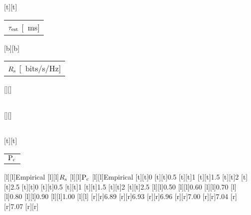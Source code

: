 %    
%
%
%
[t][t]{\fontsize{8}{12}\selectfont \color[rgb]{0,0,0}\setlength{\tabcolsep}{0pt}\begin{tabular}{c}$\tau_{\text{est}}$ [\SI{}{ms}]\end{tabular}}%
[b][b]{\fontsize{8}{12}\selectfont \color[rgb]{0,0,0}\setlength{\tabcolsep}{0pt}\begin{tabular}{c}$R_{\text{s}}$ [\SI{}{bits/s/Hz}]\end{tabular}}%
[][]{\fontsize{10}{15}\selectfont \color[rgb]{0,0,0}\setlength{\tabcolsep}{0pt}\begin{tabular}{c} \end{tabular}}%
[][]{\fontsize{10}{15}\selectfont \color[rgb]{0,0,0}\setlength{\tabcolsep}{0pt}\begin{tabular}{c} \end{tabular}}%
[t][t]{\fontsize{8}{12}\selectfont \color[rgb]{0,0,0}\setlength{\tabcolsep}{0pt}\begin{tabular}{c}$\text{P}_{\text{c}}$\end{tabular}}%
[l][l]{\fontsize{8}{12}\selectfont \color[rgb]{0,0,0}Empirical}%
[l][l]{\fontsize{8}{12}\selectfont \color[rgb]{0,0,0}$R_{\text{s}}$}%
[l][l]{\fontsize{8}{12}\selectfont \color[rgb]{0,0,0}$\text{P}_{\text{c}}$}%
[l][l]{\fontsize{8}{12}\selectfont \color[rgb]{0,0,0}Empirical}%
%
\fontsize{8}{12}%
\selectfont%
%
[t][t]{0}%
[t][t]{0.5}%
[t][t]{1}%
[t][t]{1.5}%
[t][t]{2}%
[t][t]{2.5}%
[t][t]{0}%
[t][t]{0.5}%
[t][t]{1}%
[t][t]{1.5}%
[t][t]{2}%
[t][t]{2.5}%
%
[l][l]{0.50}%
[l][l]{0.60}%
[l][l]{0.70}%
[l][l]{0.80}%
[l][l]{0.90}%
[l][l]{1.00}%
[l][l]{}%
[r][r]{6.89}%
[r][r]{6.93}%
[r][r]{6.96}%
[r][r]{7.00}%
[r][r]{7.04}%
[r][r]{7.07}%
[r][r]{}%
%
%
